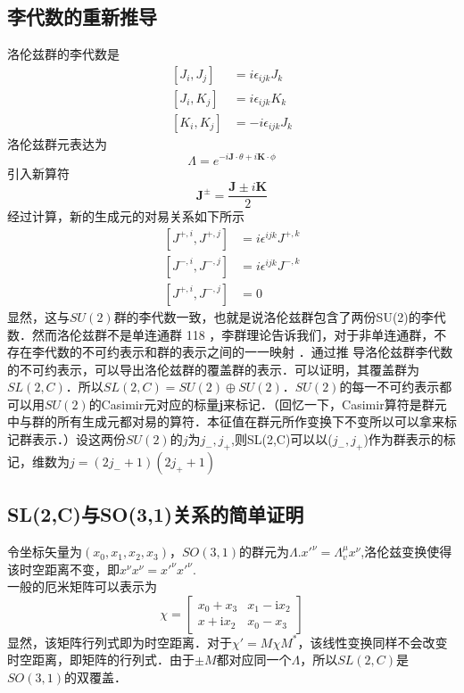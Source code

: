 \subsection{李代数的重新推导}
洛伦兹群的李代数是
\begin{equation}
\begin{aligned}
\left[J_{i}, J_{j}\right] &=i \epsilon_{i j k} J_{k} \\
\left[J_{i}, K_{j}\right] &=i \epsilon_{i j k} K_{k} \\
\left[K_{i}, K_{j}\right] &=-i \epsilon_{i j k} J_{k}
\end{aligned}
\end{equation}
洛伦兹群元表达为
\begin{equation}\label{qed3_eq1}
\Lambda=e^{-i \mathbf{J} \cdot \theta+i \mathbf{K} \cdot \phi}
\end{equation}
引入新算符
\begin{equation}
\mathbf{J}^{\pm}=\frac{\mathbf{J} \pm i \mathbf{K}}{2}
\end{equation}
经过计算，新的生成元的对易关系如下所示
\begin{equation}
\begin{aligned}
\left[J^{+, i}, J^{+, j}\right] &=i \epsilon^{i j k} J^{+, k} \\
\left[J^{-, i}, J^{-, j}\right] &=i \epsilon^{i j k} J^{-, k} \\
\left[J^{+, i}, J^{-, j}\right] &=0
\end{aligned}
\end{equation}
显然，这与$SU(2)$群的李代数一致，也就是说洛伦兹群包含了两份SU(2)的李代数．然而洛伦兹群不是单连通群 118 ，李群理论告诉我们，对于非单连通群，不存在李代数的不可约表示和群的表示之间的一一映射 ．通过推
导洛伦兹群李代数的不可约表示，可以导出洛伦兹群的覆盖群的表示．可以证明，其覆盖群为$SL(2,C)$．所以$SL(2,C)=SU(2)\oplus SU(2)$．$SU(2)$的每一不可约表示都可以用$SU(2)$的Casimir元对应的标量\textbf{j}来标记．（回忆一下，Casimir算符是群元中与群的所有生成元都对易的算符．本征值在群元所作变换下不变所以可以拿来标记群表示．）设这两份$SU(2)$的$j$为$j_-,j_+$,则SL(2,C)可以以($j_-,j_+$)作为群表示的标记，维数为$j=(2j_-+1)(2j_++1)$
\subsection{SL(2,C)与SO(3,1)关系的简单证明}
令坐标矢量为$(x_0,x_1,x_2,x_3)$，$SO(3,1)$的群元为$\Lambda$.$x'^{\nu}=\Lambda_{v}^{\mu} x^{\nu}$,洛伦兹变换使得该时空距离不变，即$x^\nu x^\nu=x'^\nu x'^\nu$.
\\一般的厄米矩阵可以表示为
\begin{equation}
\chi=\left[\begin{array}{cc}
x_0+x_3 & x_1-\mathrm{i} x_2 \\
x+\mathrm{i}x_2 & x_0-x_3
\end{array}\right]
\end{equation}
显然，该矩阵行列式即为时空距离．对于$\chi'=M \chi M^{*}$，该线性变换同样不会改变时空距离，即矩阵的行列式．由于$\pm M$都对应同一个$\Lambda$，所以$SL(2,C)$是$SO(3,1)$的双覆盖．
